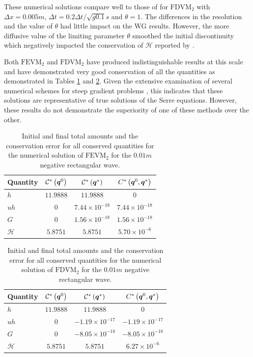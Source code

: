 These numerical solutions compare well to those of \citet{Zoppou-etal-2017} for $\text{FDVM}_2$ with $\Delta x = 0.005m$, $\Delta t = 0.2 \Delta t / \sqrt{g 0.1} s$ and $\theta = 1$. The differences in the resolution and the value of $\theta$ had little impact on the WG results. However, the more diffusive value of the limiting parameter $\theta$ smoothed the initial discontinuity which negatively impacted the conservation of $\mathcal{H}$ reported by \citet{Zoppou-etal-2017}.

Both $\text{FEVM}_2$ and $\text{FDVM}_2$ have produced indistinguishable results at this scale and have demonstrated very good conservation of all the quantities as demonstrated in Tables \ref{tab:ConservationSegurFEVM1cm} and \ref{tab:ConservationSegurFDVM1cm}. Given the extensive examination of several numerical schemes for steep gradient problems \cite{Pitt-2018-61}, this indicates that these solutions are representative of true solutions of the Serre equations. However, these results do not demonstrate the superiority of one of these methods over the other. 
%
\begin{table}
	\centering
	\begin{tabular}{l  c  c c}
		Quantity& $\mathcal{C}^*\left(\boldsymbol{q}^0\right)$ & $\mathcal{C}^*\left(\boldsymbol{q}^*\right)$ & ${C}^*\left(\boldsymbol{q}^0,\boldsymbol{q}^*\right)$ \B\\
		\hline
		$h$ & $11.9888$ & $11.9888$ & $0$ \T\\
		$uh$ & $0$ & $7.44 \times 10^{-18}$ & $7.44 \times 10^{-18}$\\
		$G$ & $0$ & $1.56\times 10^{-18}$ & $1.56\times 10^{-18}$\\
		$\mathcal{H}$ & $5.8751$ & $5.8751$ & $5.70 \times 10^{-6}$ \B \\
		\hline
	\end{tabular}
	\caption{Initial and final total amounts and the conservation error for all conserved quantities for the numerical solution of $\text{FEVM}_2$ for the $0.01m$ negative rectangular wave.}
	\label{tab:ConservationSegurFEVM1cm}
\end{table} 
%
\begin{table}
	\centering
	\begin{tabular}{l  c  c c}
		Quantity& $\mathcal{C}^*\left(\boldsymbol{q}^0\right)$ & $\mathcal{C}^*\left(\boldsymbol{q}^*\right)$ & ${C}^*\left(\boldsymbol{q}^0,\boldsymbol{q}^*\right)$ \B \\
		\hline
		$h$ & $11.9888$ & $11.9888$ & $0$ \T\\
		$uh$ & $0$ & $-1.19 \times 10^{-17}$ & $-1.19 \times 10^{-17}$\\
		$G$ & $0$ & $-8.05\times 10^{-18}$ & $-8.05\times 10^{-18}$\\
		$\mathcal{H}$ & $5.8751$ & $5.8751$ & $6.27 \times 10^{-6}$ \B\\
		\hline
	\end{tabular}
	\caption{Initial and final total amounts and the conservation error for all conserved quantities for the numerical solution of $\text{FDVM}_2$ for the $0.01m$ negative rectangular wave.}
	\label{tab:ConservationSegurFDVM1cm}
\end{table}  

